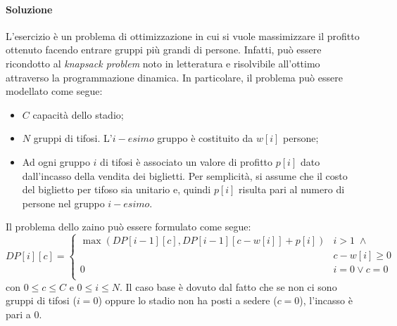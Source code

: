 \documentclass{article}
\begin{document}
\paragraph{Soluzione} L'esercizio è un problema di ottimizzazione in cui si vuole massimizzare il profitto ottenuto facendo entrare gruppi più grandi di persone. Infatti, può essere ricondotto al \textit{knapsack problem} noto in letteratura e risolvibile all'ottimo attraverso la programmazione dinamica. In particolare, il problema può essere modellato come segue:
\begin{itemize}
    \item $C$ capacità dello stadio;
    \item $N$ gruppi di tifosi. L'$i-esimo$ gruppo è costituito da $w[i]$ persone;
    \item Ad ogni gruppo $i$ di tifosi è associato un valore di profitto $p[i]$ dato dall'incasso della vendita dei biglietti. Per semplicità, si assume che il costo del biglietto per tifoso sia unitario e, quindi $p[i]$ risulta pari al numero di persone nel gruppo $i-esimo$.
\end{itemize}

Il problema dello zaino può essere formulato come segue:
\begin{equation*}
    DP[i][c]=\begin{cases}
        \max(DP[i-1][c], DP[i-1][c-w[i]] + p[i])& i > 1 \; \land\\
        &c - w[i] \geq 0 \\
        0 & i = 0 \lor c = 0 \\
    \end{cases}
\end{equation*}
con $0 \leq c \leq C$ e $0 \leq i \leq N$. Il caso base è dovuto dal fatto che se non ci sono gruppi di tifosi ($i = 0$) oppure lo stadio non ha posti a sedere ($c = 0$), l'incasso è pari a $0$.
\end{document}
